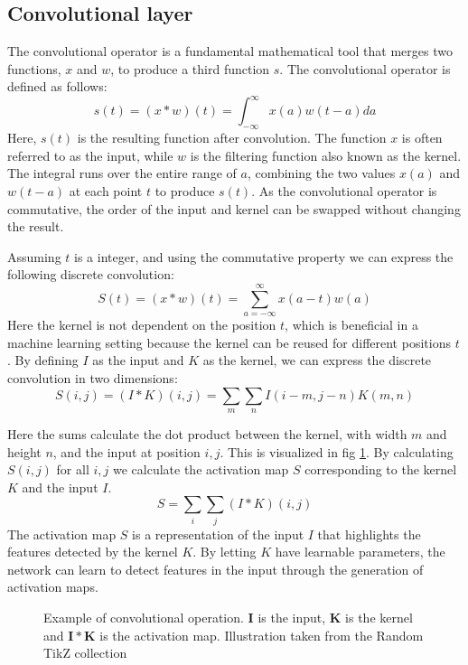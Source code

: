 \subsection{Convolutional layer}
The convolutional operator is a fundamental mathematical tool that merges two functions, $x$ and $w$, to produce a third function $s$. The convolutional operator is defined as follows:
\begin{equation}
    s(t) = (x*w)(t) = \int_{-\infty}^\infty x(a)w(t-a)d a
\end{equation}
Here, $s(t)$ is the resulting function after convolution. The function $x$ is often referred to as the input, while $w$ is the filtering function also known as the kernel.
The integral runs over the entire range of $a$, combining the two values $x(a)$ and $w(t-a)$ at each point $t$ to produce $s(t)$.
As the convolutional operator is commutative, the order of the input and kernel can be swapped without changing the result.

Assuming $t$ is a integer, and using the commutative property we can express the following discrete convolution:
\begin{equation}
    S(t) = (x*w)(t) = \sum_{a=-\infty}^\infty x(a-t)w(a)
\end{equation}
Here the kernel is not dependent on the position $t$, which is beneficial in a machine learning setting because the kernel can be reused for different positions $t$. 
By defining $I$ as the input and $K$ as the kernel, we can express the discrete convolution in two dimensions:
\begin{equation}
    S(i, j) = (I*K)(i, j) = \sum_m \sum_n I(i-m, j-n)K(m, n)
\end{equation}

Here the sums calculate the dot product between the kernel, with width $m$ and height $n$, and the input at position $i, j$. This is visualized in fig \ref{fig:conv}. By calculating $S(i, j)$ for all $i, j$ we calculate the activation map $S$ corresponding to the kernel $K$ and the input $I$.
\begin{equation}
    S = \sum_i \sum_j (I*K)(i, j)
    \label{eq:activation}
\end{equation}
The activation map $S$ is a representation of the input $I$ that highlights the features detected by the kernel $K$. 
By letting $K$ have learnable parameters, the network can learn to detect features in the input through the generation of activation maps.

\begin{figure}[H]
    \centering
    
    \caption{Example of convolutional operation. $\mathbf{I}$ is the input, $\mathbf{K}$ is the kernel and $\mathbf{I} * \mathbf{K}$ is the activation map. Illustration taken from the Random TikZ collection\cite{RiebesellTikZ2022}}
    \label{fig:conv}
\end{figure}

